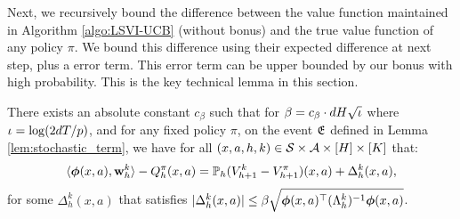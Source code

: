 Next, we recursively bound the difference between the value function maintained in Algorithm \ref{algo:LSVI-UCB} (without bonus) and the true value function of any policy $\pi$. We bound this difference using their expected difference at next step, plus a error term. This error term can be upper bounded by our bonus with high probability. This is the key technical lemma in this section.

\begin{lemma}\label{lem:basic_relation}
There exists an absolute constant $c_\beta$ such that for $\beta = c_\beta \cdot dH\sqrt{\iota}$ where $\iota = \log (2dT/p)$, and
for any fixed policy $\pi$, on the event $\mathfrak{E}$ defined in Lemma \ref{lem:stochastic_term}, we have for all $(x, a, h, k) \in \mathcal{S}\times\mathcal{A}\times[H]\times[K]$ that:
\begin{equation*}
\langle\bm{\phi}(x, a), \mathbf{w}^k_h\rangle - Q_h^\pi(x, a)  =  \mathbb{P}_h (V^{k}_{h+1} - V^{\pi}_{h+1})(x, a) + \Delta^k_h(x, a),
\end{equation*}
for some $\Delta^k_h(x, a)$ that satisfies $|\Delta^k_h(x, a)| \le \beta \sqrt{\bm{\phi}(x, a)^{\top} (\Lambda^k_h)^{-1}  \bm{\phi}(x, a)}$.
\end{lemma}

